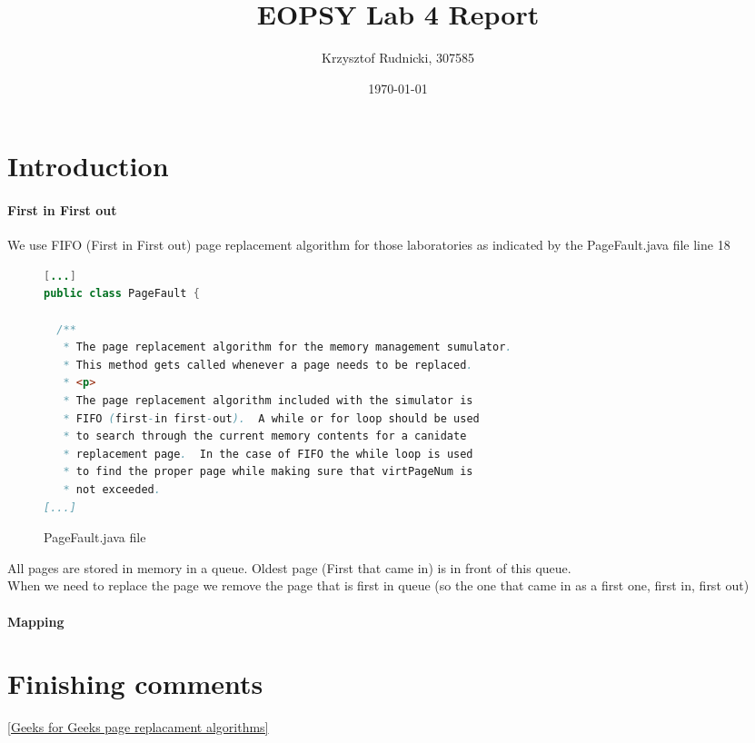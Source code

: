 \documentclass{article}
\begin{document}
\title{EOPSY Lab 4 Report}
\author{Krzysztof Rudnicki, 307585}
\date{\today}
\maketitle
\section{Introduction}
\paragraph{First in First out}
We use FIFO (First in First out) page replacement algorithm for those laboratories as indicated
by the PageFault.java file line 18
\begin{figure}[H]
\caption{PageFault.java file}
\begin{lstlisting}[language=Java]
[...]
public class PageFault {

  /**
   * The page replacement algorithm for the memory management sumulator.
   * This method gets called whenever a page needs to be replaced.
   * <p>
   * The page replacement algorithm included with the simulator is 
   * FIFO (first-in first-out).  A while or for loop should be used 
   * to search through the current memory contents for a canidate 
   * replacement page.  In the case of FIFO the while loop is used 
   * to find the proper page while making sure that virtPageNum is 
   * not exceeded.
[...]
\end{lstlisting}
\end{figure}
All pages are stored in memory in a queue. Oldest page (First that came in) is
in front of this queue. \\ When we need to replace the page we remove the page that
is first in queue (so the one that came in as a first one, first in, first out)
\cite{Page Replacement Algorithms}
\paragraph{Mapping}


\section{Finishing comments}
\begin{thebibliography}{9}
\href{https://www.geeksforgeeks.org/page-replacement-algorithms-in-operating-systems/}{[Geeks
for Geeks page replacament algorithms]}
\end{thebibliography}
\end{document}
